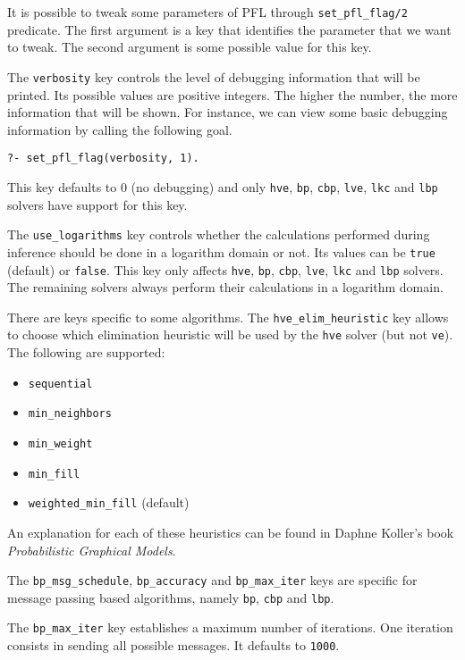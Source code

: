 \documentclass{article}
\begin{document}
It is possible to tweak some parameters of PFL through \texttt{set\_pfl\_flag/2} predicate. The first argument is a key that identifies the parameter that we want to tweak. The second argument is some possible value for this key.

The \texttt{verbosity} key controls the level of debugging information that will be printed. Its possible values are positive integers. The higher the number, the more information that will be shown. For instance, we can view some basic debugging information by calling the following goal.

\texttt{?- set\_pfl\_flag(verbosity, 1).}

This key defaults to 0 (no debugging) and only \texttt{hve}, \texttt{bp}, \texttt{cbp}, \texttt{lve}, \texttt{lkc} and \texttt{lbp} solvers have support for this key.

The \texttt{use\_logarithms} key controls whether the calculations performed during inference should be done in a logarithm domain or not. Its values can be \texttt{true} (default) or \texttt{false}. This key only affects \texttt{hve}, \texttt{bp}, \texttt{cbp}, \texttt{lve}, \texttt{lkc} and \texttt{lbp} solvers. The remaining solvers always perform their calculations in a logarithm domain.

There are keys specific to some algorithms. The \texttt{hve\_elim\_heuristic} key allows to choose which elimination heuristic will be used by the \texttt{hve} solver (but not \texttt{ve}). The following are supported:
\begin{itemize}
 \item \texttt{sequential}
 \item \texttt{min\_neighbors}
 \item \texttt{min\_weight}
 \item \texttt{min\_fill}
 \item \texttt{weighted\_min\_fill} (default)
\end{itemize}

An explanation for each of these heuristics can be found in Daphne Koller's book \textit{Probabilistic Graphical Models}.

The \texttt{bp\_msg\_schedule}, \texttt{bp\_accuracy} and \texttt{bp\_max\_iter} keys are specific for message passing based algorithms, namely \texttt{bp}, \texttt{cbp} and \texttt{lbp}.

The \texttt{bp\_max\_iter} key establishes a maximum number of iterations. One iteration consists in sending all possible messages. It defaults to \texttt{1000}.
\end{document}
